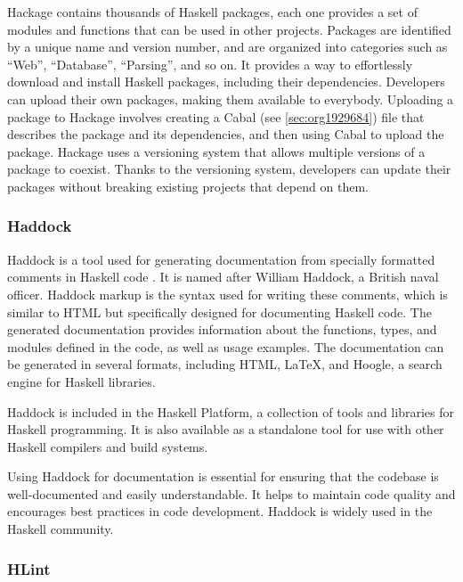 \documentclass[a4paper, titlepage, twoside]{article}
\begin{document}
Hackage contains thousands of Haskell packages, each one provides a set of modules and functions that can be used in other projects.  Packages are identified by a unique name and version number, and are organized into categories such as ``Web'', ``Database'', ``Parsing'', and so on. It provides a way to effortlessly download and install Haskell packages, including their dependencies. Developers can upload their own packages, making them available to everybody. Uploading a package to Hackage involves creating a Cabal (see \ref{sec:org1929684}) file that describes the package and its dependencies, and then using Cabal to upload the package. Hackage uses a versioning system that allows multiple versions of a package to coexist. Thanks to the versioning system, developers can update their packages without breaking existing projects that depend on them.

\subsubsection{Haddock}
\label{sec:org9df7987}

Haddock is a tool used for generating documentation from specially formatted comments in Haskell code \autocite{haddockHaddockDocumentation2023}. It is named after William Haddock, a British naval officer. Haddock markup is the syntax used for writing these comments, which is similar to HTML but specifically designed for documenting Haskell code. The generated documentation provides information about the functions, types, and modules defined in the code, as well as usage examples. The documentation can be generated in several formats, including HTML, \LaTeX{}, and Hoogle, a search engine for Haskell libraries.

Haddock is included in the Haskell Platform, a collection of tools and libraries for Haskell programming. It is also available as a standalone tool for use with other Haskell compilers and build systems.

Using Haddock for documentation is essential for ensuring that the codebase is well-documented and easily understandable. It helps to maintain code quality and encourages best practices in code development. Haddock is widely used in the Haskell community.

\subsubsection{HLint}
\label{sec:orgf40c416}
\end{document}
